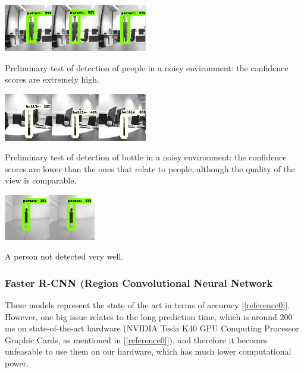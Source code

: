 \documentclass[10pt,conference,compsocconf]{IEEEtran}
\begin{document}
\begin{center}
	\captionsetup{type=figure}
	\includegraphics[width=0.47\textwidth]{img/person_detection.png}
	\caption {Preliminary test of detection of people in a noisy environment: the confidence scores are extremely high.}
	\label{fig:person_detection}
\end{center}
\begin{center}
	\captionsetup{type=figure}
	\includegraphics[width=0.47\textwidth]{img/bottle_detection.png}
	\caption {Preliminary test of detection of bottle in a noisy environment: the confidence scores are lower than the ones that relate to people, although the quality of the view is comparable.}
	\label{fig:bottle_detection}
\end{center}
\begin{center}
	\captionsetup{type=figure}
	\includegraphics[width=0.30\textwidth]{img/person_bad_position.png}
	\caption {A person not detected very well.}
	\label{fig:person_bad_position}
\end{center}
\subsubsection{Faster R-CNN (Region Convolutional Neural Network}
These models represent the state of the art in terms of accuracy [\ref{reference0}]. However, one big issue relates to the long prediction time, which is around 200 ms on state-of-the-art hardware (NVIDIA Tesla K40 GPU Computing Processor Graphic Cards, as mentioned in [\ref{reference0}]), and therefore it becomes unfeasable to use them on our hardware, which has much lower computational power.
\end{document}

